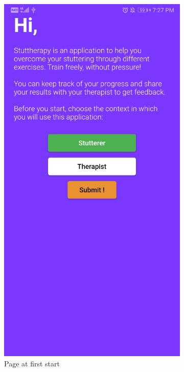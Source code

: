 \begin{appendices}
\begin{landscape}
\begin{figure}[h]
  \centering
  \begin{subfigure}{.25\textwidth}
    \centering
    \includegraphics[width=.75\linewidth]{content/imgs/screen1.jpg}
    \caption{Page at first start}
  \end{subfigure}%
  \begin{subfigure}{.25\textwidth}
    \centering

\end{subfigure}
\end{figure}
\end{landscape}
\end{appendices}
